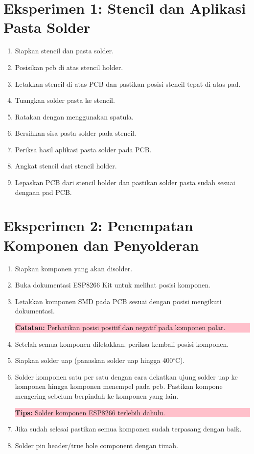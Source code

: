 \section{Eksperimen 1: Stencil dan Aplikasi Pasta Solder}
\begin{enumerate}
    \item Siapkan stencil dan pasta solder.
    \item Posisikan pcb di atas stencil holder.
    \item Letakkan stencil di atas PCB dan pastikan posisi stencil tepat di atas pad.
    \item Tuangkan solder pasta ke stencil.
    \item Ratakan dengan menggunakan spatula.
    \item Bersihkan sisa pasta solder pada stencil.
    \item Periksa hasil aplikasi pasta solder pada PCB.
    \item Angkat stencil dari stencil holder.
    \item Lepaskan PCB dari stencil holder dan pastikan solder pasta sudah sesuai dengaan pad PCB.
\end{enumerate}

\section{Eksperimen 2: Penempatan Komponen dan Penyolderan}
\begin{enumerate}
    \item Siapkan komponen yang akan disolder.
    \item Buka dokumentasi ESP8266 Kit untuk melihat posisi komponen.
    \item Letakkan komponen SMD pada PCB sesuai dengan posisi mengikuti dokumentasi.
    \begin{center}
        \colorbox{pink}{\parbox{0.8\linewidth}{\textbf{Catatan:} Perhatikan posisi positif dan negatif pada komponen polar.}}
    \end{center}
    
    \item Setelah semua komponen diletakkan, periksa kembali posisi komponen.
    \item Siapkan solder uap (panaskan solder uap hingga 400$^{\circ}$C).
    \item Solder komponen satu per satu dengan cara dekatkan ujung solder uap ke komponen hingga komponen menempel pada pcb. Pastikan kompone mengering sebelum berpindah ke komponen yang lain.
    \begin{center}
        \colorbox{pink}{\parbox{0.8\linewidth}{\textbf{Tips:} Solder komponen ESP8266 terlebih dahulu.}}
    \end{center}
    \item Jika sudah selesai pastikan semua komponen sudah terpasang dengan baik.
    \item Solder pin header/true hole component dengan timah.
\end{enumerate}

